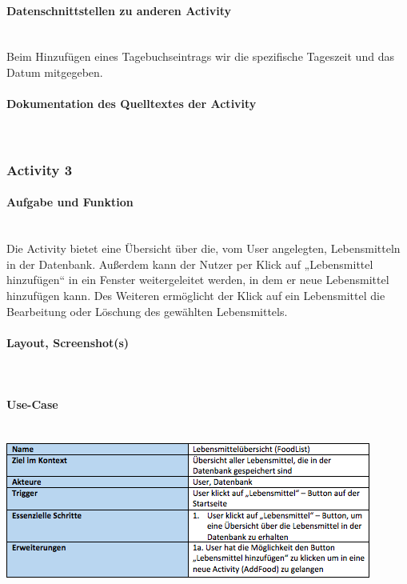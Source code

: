\paragraph{Datenschnittstellen zu anderen Activity}\\
Beim Hinzufügen eines Tagebuchseintrags wir die spezifische Tageszeit und das Datum mitgegeben.

\paragraph{Dokumentation des Quelltextes der Activity}\\

\subsubsection{Activity 3}

\paragraph{Aufgabe und Funktion}\\
Die Activity bietet eine Übersicht über die, vom User angelegten, Lebensmitteln in der Datenbank. Außerdem kann der Nutzer per Klick auf „Lebensmittel hinzufügen“ in ein Fenster weitergeleitet werden, in dem er neue Lebensmittel hinzufügen kann. Des Weiteren ermöglicht der Klick auf ein Lebensmittel die Bearbeitung oder Löschung des gewählten Lebensmittels.

\paragraph{Layout, Screenshot(s)}\\
\paragraph{Use-Case}$~~$\\
\newline
\includegraphics[scale=1]{img/usecasefoodlist}\\
